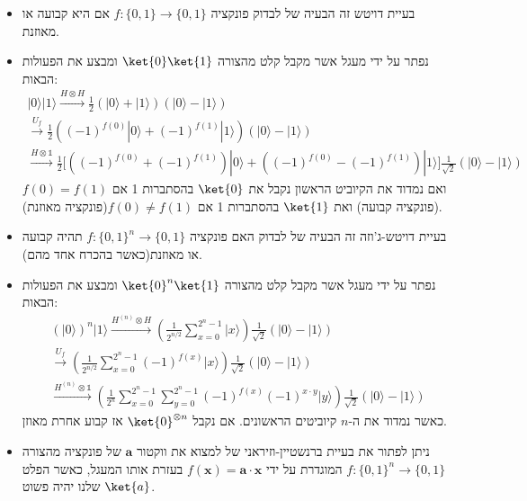\documentclass{tstextbook}
\begin{document}
\begin{summary}
  \begin{itemize}
    \item בעיית דויטש זה הבעיה של לבדוק פונקציה \(f:\{ 0,1 \}\to \{ 0,1 \}\) אם היא קבועה או מאוזנת.
    \item נפתר על ידי מעגל אשר מקבל קלט מהצורה \(\ket{0}\ket{1}\) ומבצע את הפעולות הבאות:
\begin{gather*}|0\rangle|1\rangle\xrightarrow{H\otimes H}\frac{1}{2}(|0\rangle+|1\rangle)(|0\rangle-|1\rangle)\\ \xrightarrow{U_{f}}\frac{1}{2}\left((-1)^{f(0)}|0\rangle+(-1)^{f(1)}|1\rangle\right)\left(|0\rangle-|1\rangle\right)\\ \xrightarrow{H\otimes \mathbb{1} }\frac{1}{2}\Bigg[\left((-1)^{f(0)}+(-1)^{f(1)}\right)|0\rangle+\left((-1)^{f(0)}-(-1)^{f(1)}\right)|1\rangle\Bigg]\frac{1}{\sqrt{2}}(|0\rangle-|1\rangle) 
\end{gather*}
ואם נמדוד את הקיוביט הראשון נקבל את \(\ket{0}\) בהסתברות 1 אם \(f(0)=f(1)\) (פונקציה קבועה) ואת \(\ket{1}\) בהסתברות 1 אם \(f(0)\neq f(1)\)(פונקציה מאוזנת). 
    \item בעיית דויטש-ג'וזה זה הבעיה של לבדוק האם פונקציה \(f:\{ 0,1 \}^{n}\to \{ 0,1 \}\) תהיה קבועה או מאוזנת(כאשר בהכרח אחד מהם).
    \item נפתר על ידי מעגל אשר מקבל קלט מהצורה \(\ket{0}^{n}\ket{1}\) ומבצע את הפעולות הבאות:
\begin{gather*}{{\left( |0\rangle \right)^{n}|1\rangle\xrightarrow{H^{(n)}\otimes H}\left(\frac{1}{2^{n/2}}\sum_{x=0}^{2^{n}-1}|x\rangle\right)\frac{1}{\sqrt{2}}\left( |0\rangle-|1\rangle \right)}}\\ {{\xrightarrow{U_{f}}\left(\frac{1}{2^{n/2}}\sum_{x=0}^{2^{n}-1}(-1)^{f(x)}|x\rangle\right)\frac{1}{\sqrt{2}}\left( |0\rangle-|1\rangle \right)}}\\ {{\xrightarrow{H^{(n) }\otimes \mathbb{ 1}}\left(\frac{1}{2^{n}}\sum_{x=0}^{2^{n}-1}\sum_{y=0}^{2^{n}-1}(-1)^{f(x)}(-1)^{x\cdot y}|y\rangle\right)\frac{1}{\sqrt{2}}\left( |0\rangle-|1\rangle \right)}} 
\end{gather*}
כאשר נמדוד את ה-\(n\) קיוביטים הראשונים. אם נקבל \(\ket{0}^{\otimes n}\) אז קבוע אחרת מאוזן.
    \item ניתן לפתור את בעיית ברנשטיין-וזיראני של למצוא את ווקטור \(\mathbf{a}\) של פונקציה מהצורה \(f:\{ 0,1 \}^{n}\to\{ 0,1 \}\) המוגדרת על ידי \(f\left( \mathbf{x} \right)=\mathbf{a}\cdot \mathbf{x}\) בעזרת אותו המעגל, כאשר הפלט שלנו יהיה פשוט \(\ket{a}\).
  \end{itemize}
\end{summary}
\end{document}
